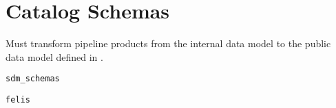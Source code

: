 \section{Catalog Schemas}
\label{sec:schemas}

Must transform pipeline products from the internal data model to the public data model defined in \citet{LSE-163}.

\texttt{sdm\_schemas}

\texttt{felis}
\citep{2024arXiv241209721M}
